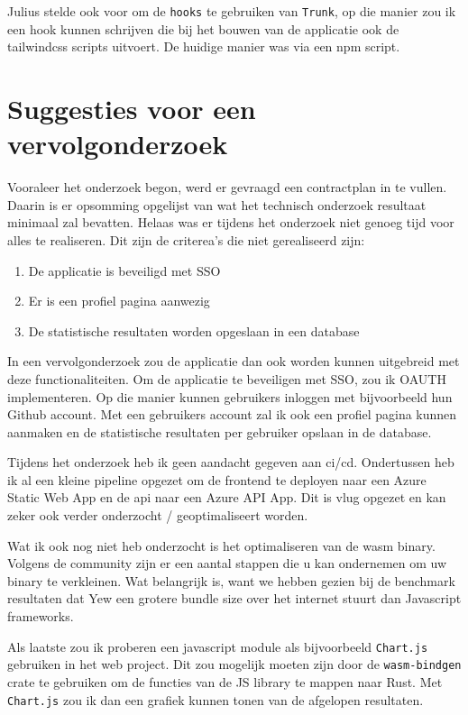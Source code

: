 Julius stelde ook voor om de \texttt{hooks} te gebruiken van \texttt{Trunk}, op
die manier zou ik een hook kunnen schrijven die bij het bouwen van de applicatie ook de tailwindcss
scripts uitvoert. De huidige manier was via een npm script.

\section{Suggesties voor een vervolgonderzoek}

Vooraleer het onderzoek begon, werd er gevraagd een contractplan in te vullen. Daarin is er
opsomming opgelijst van wat het technisch onderzoek resultaat minimaal zal bevatten. Helaas was er
tijdens het onderzoek niet genoeg tijd voor alles te realiseren. Dit zijn de criterea's die niet
gerealiseerd zijn:
\begin{enumerate}
  \item De applicatie is beveiligd met SSO
  \item Er is een profiel pagina aanwezig
  \item De statistische resultaten worden opgeslaan in een database
\end{enumerate}
In een vervolgonderzoek zou de applicatie dan ook worden kunnen uitgebreid met deze
functionaliteiten. Om de applicatie te beveiligen met SSO, zou ik OAUTH implementeren. Op die manier
kunnen gebruikers inloggen met bijvoorbeeld hun Github account.  Met een gebruikers account zal ik
ook een profiel pagina kunnen aanmaken en de statistische resultaten per gebruiker opslaan in de
database.

Tijdens het onderzoek heb ik geen aandacht gegeven aan ci/cd. Ondertussen heb ik al een kleine
pipeline opgezet om de frontend te deployen naar een Azure Static Web App en de api naar een Azure
API App. Dit is vlug opgezet en kan zeker ook verder onderzocht / geoptimaliseert worden.

Wat ik ook nog niet heb onderzocht is het optimaliseren van de wasm binary.\cite{wasm_size} Volgens
de community zijn er een aantal stappen die u kan ondernemen om uw binary te verkleinen. Wat
belangrijk is, want we hebben gezien bij de benchmark resultaten dat Yew een grotere bundle size
over het internet stuurt dan Javascript frameworks.

Als laatste zou ik proberen een javascript module als bijvoorbeeld \texttt{Chart.js}
gebruiken in het web project. Dit zou mogelijk moeten zijn door de \texttt{wasm-bindgen}
crate te gebruiken om de functies van de JS library te mappen naar Rust. Met
\texttt{Chart.js} zou ik dan een grafiek kunnen tonen van de afgelopen resultaten.
